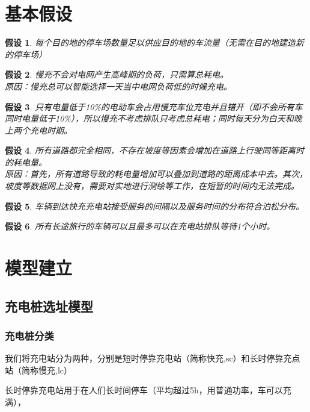 \documentclass[12pt, a4paper, oneside]{ctexart}
\newtheorem{assumption}{假设}[section]
\begin{document}
\section{基本假设}
\begin{assumption}\label{asmp:lcpark}
    每个目的地的停车场数量足以供应目的地的车流量（无需在目的地建造新的停车场）
\end{assumption}
\begin{assumption}\label{asmp:lcload}
    慢充不会对电网产生高峰期的负荷，只需算总耗电。\\
    原因：慢充总可以智能选择一天当中电网负荷低的时候充电。
\end{assumption}
\begin{assumption}\label{asmp:lcoccupy}
    只有电量低于10\%的电动车会占用慢充车位充电并且错开（即不会所有车同时电量低于10\%），所以慢充不考虑排队只考虑总耗电；同时每天分为白天和晚上两个充电时期。
\end{assumption}
\begin{assumption}\label{asmp:cost}
    所有道路都完全相同，不存在坡度等因素会增加在道路上行驶同等距离时的耗电量。\\
    原因：首先，所有道路导致的耗电量增加可以叠加到道路的距离成本中去。其次，坡度等数据网上没有，需要对实地进行测绘等工作，在短暂的时间内无法完成。
\end{assumption}
\begin{assumption}
    \label{asmp:serve}
    车辆到达快充充电站接受服务的间隔以及服务时间的分布符合泊松分布。
\end{assumption}
\begin{assumption}
    所有长途旅行的车辆可以且最多可以在充电站排队等待1个小时。
\end{assumption}


\section{模型建立}
\subsection{充电桩选址模型}
\subsubsection{充电桩分类}
我们将充电站分为两种，分别是短时停靠充电站（简称快充,sc）和长时停靠充点站（简称慢充,lc）

长时停靠充电站用于在人们长时间停车（平均超过5h，用普通功率，车可以充满），
\end{document}
